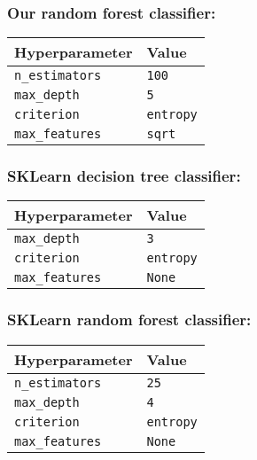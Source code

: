 \documentclass[11pt]{article}
\begin{document}
\subsubsection{Our random forest
classifier:}\label{our-random-forest-classifier}

\begin{longtable}[]{@{}ll@{}}
\toprule\noalign{}
Hyperparameter & Value \\
\midrule\noalign{}
\endhead
\bottomrule\noalign{}
\endlastfoot
\texttt{n\_estimators} & \texttt{100} \\
\texttt{max\_depth} & \texttt{5} \\
\texttt{criterion} & \texttt{entropy} \\
\texttt{max\_features} & \texttt{sqrt} \\
\end{longtable}

\subsubsection{SKLearn decision tree
classifier:}\label{sklearn-decision-tree-classifier}

\begin{longtable}[]{@{}ll@{}}
\toprule\noalign{}
Hyperparameter & Value \\
\midrule\noalign{}
\endhead
\bottomrule\noalign{}
\endlastfoot
\texttt{max\_depth} & \texttt{3} \\
\texttt{criterion} & \texttt{entropy} \\
\texttt{max\_features} & \texttt{None} \\
\end{longtable}

\subsubsection{SKLearn random forest
classifier:}\label{sklearn-random-forest-classifier}

\begin{longtable}[]{@{}ll@{}}
\toprule\noalign{}
Hyperparameter & Value \\
\midrule\noalign{}
\endhead
\bottomrule\noalign{}
\endlastfoot
\texttt{n\_estimators} & \texttt{25} \\
\texttt{max\_depth} & \texttt{4} \\
\texttt{criterion} & \texttt{entropy} \\
\texttt{max\_features} & \texttt{None} \\
\end{longtable}
\end{document}
